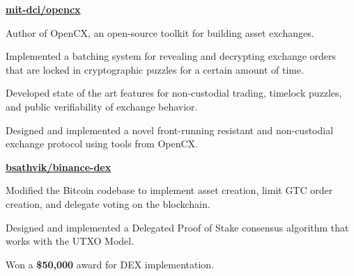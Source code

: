 
\hfill \href{https://github.com/mit-dci/opencx}{\textbf{mit-dci/opencx}}
\begin{tightemize}
  \item Author of OpenCX, an open-source toolkit for building asset exchanges.
  \item Implemented a batching system for revealing and decrypting exchange orders that are locked in cryptographic puzzles for a certain amount of time.
  \item Developed state of the art features for non-custodial trading,
      timelock puzzles, and public verifiability of exchange behavior.
  \item Designed and implemented a novel front-running resistant and non-custodial exchange protocol using tools from OpenCX.
\end{tightemize}
\subsectionsep


\hfill \href{https://github.com/bsathvik/binance-dex}{\textbf{bsathvik/binance-dex}}
\begin{tightemize}
  \item Modified the Bitcoin codebase to implement asset creation, limit GTC
    order creation, and delegate voting on the blockchain.
  \item Designed and implemented a Delegated Proof of
      Stake consensus algorithm that works with the UTXO Model.
  \item Won a \textbf{\$50,000} award for DEX implementation.
\end{tightemize}
